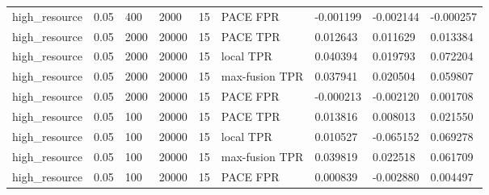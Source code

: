 \begin{tabular}{lllllllll}
high\_resource & 0.05 & 400 & 2000 & 15 & PACE FPR & -0.001199 & -0.002144 & -0.000257 \\
high\_resource & 0.05 & 2000 & 20000 & 15 & PACE TPR & 0.012643 & 0.011629 & 0.013384 \\
high\_resource & 0.05 & 2000 & 20000 & 15 & local TPR & 0.040394 & 0.019793 & 0.072204 \\
high\_resource & 0.05 & 2000 & 20000 & 15 & max-fusion TPR & 0.037941 & 0.020504 & 0.059807 \\
high\_resource & 0.05 & 2000 & 20000 & 15 & PACE FPR & -0.000213 & -0.002120 & 0.001708 \\
high\_resource & 0.05 & 100 & 20000 & 15 & PACE TPR & 0.013816 & 0.008013 & 0.021550 \\
high\_resource & 0.05 & 100 & 20000 & 15 & local TPR & 0.010527 & -0.065152 & 0.069278 \\
high\_resource & 0.05 & 100 & 20000 & 15 & max-fusion TPR & 0.039819 & 0.022518 & 0.061709 \\
high\_resource & 0.05 & 100 & 20000 & 15 & PACE FPR & 0.000839 & -0.002880 & 0.004497 \\
\bottomrule
\end{tabular}

